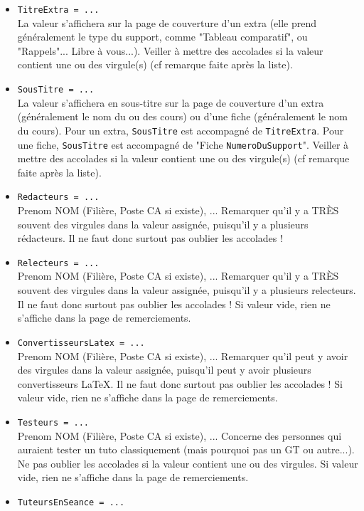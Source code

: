 \documentclass[a4paper,11pt]{article}
\begin{document}
\begin{itemize}
    \item \texttt{TitreExtra = ...}\\
        La valeur s'affichera sur la page de couverture d'un extra (elle prend généralement le type du support, comme "Tableau comparatif", ou "Rappels"... Libre à vous...). Veiller à mettre des accolades si la valeur contient une ou des virgule(s) (cf remarque faite après la liste).
    \item \texttt{SousTitre = ...}\\
        La valeur s'affichera en sous-titre sur la page de couverture d'un extra (généralement le nom du ou des cours) ou d'une fiche (généralement le nom du cours). Pour un extra, \texttt{SousTitre} est accompagné de \texttt{TitreExtra}. Pour une fiche, \texttt{SousTitre} est accompagné de "Fiche \texttt{NumeroDuSupport}". Veiller à mettre des accolades si la valeur contient une ou des virgule(s) (cf remarque faite après la liste).
    \item \texttt{Redacteurs = {...}}\\
        Prenom NOM (Filière, Poste CA si existe), ... Remarquer qu'il y a TRÈS souvent des virgules dans la valeur assignée, puisqu'il y a plusieurs rédacteurs. Il ne faut donc surtout pas oublier les accolades !
    \item \texttt{Relecteurs = {...}}\\
        Prenom NOM (Filière, Poste CA si existe), ... Remarquer qu'il y a TRÈS souvent des virgules dans la valeur assignée, puisqu'il y a plusieurs relecteurs. Il ne faut donc surtout pas oublier les accolades ! Si valeur vide, rien ne s'affiche dans la page de remerciements.
    \item \texttt{ConvertisseursLatex = {...}}\\
        Prenom NOM (Filière, Poste CA si existe), ... Remarquer qu'il peut y avoir des virgules dans la valeur assignée, puisqu'il peut y avoir plusieurs convertisseurs \LaTeX{}. Il ne faut donc surtout pas oublier les accolades ! Si valeur vide, rien ne s'affiche dans la page de remerciements.
    \item \texttt{Testeurs = {...}}\\
        Prenom NOM (Filière, Poste CA si existe), ... Concerne des personnes qui auraient tester un tuto classiquement (mais pourquoi pas un GT ou autre...). Ne pas oublier les accolades si la valeur contient une ou des virgules. Si valeur vide, rien ne s'affiche dans la page de remerciements.
    \item \texttt{TuteursEnSeance = ...}\\

\end{itemize}
\end{document}
